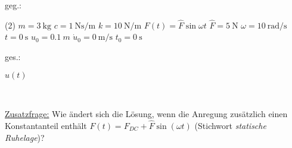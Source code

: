     


    \begin{minipage}[t]{.49\linewidth}
        geg.:
        \begin{tasks} (2)
           \task[] $m = \SI{3}{\kilo\gram}$
           \task[] $c = \SI{1}{\newton\second\per\meter}$
           \task[] $k = \SI{10}{\newton\per\meter}$
            \task[] $F(t) = \hat{F} \sin{\omega t}$
           \task[] $\hat{F} = \SI{5}{\newton}$
           \task[] $\omega = \SI{10}{\radian\per\second}$
           \task[] $t=\SI{0}{\second}$
           \task[] $u_0 = \SI{0.1}{m}$
           \task[] $\dot{u}_0 = \SI{0}{\meter\per\second}$
           \task[] $t_0 = \SI{0}{\second}$
        \end{tasks}
        \end{minipage}
        \begin{minipage}[t]{.49\linewidth}
        ges.:
        \begin{tasks}
            \task[] $u(t)$
        \end{tasks}
    \end{minipage}\\
    \vspace{1cm}

    \underline{Zusatzfrage:} Wie ändert sich die Lösung, wenn die Anregung zusätzlich einen Konstantanteil enthält $F(t) = F_{DC} +\hat{F} \sin{(\omega t)}$ (Stichwort \textit{statische Ruhelage})?

